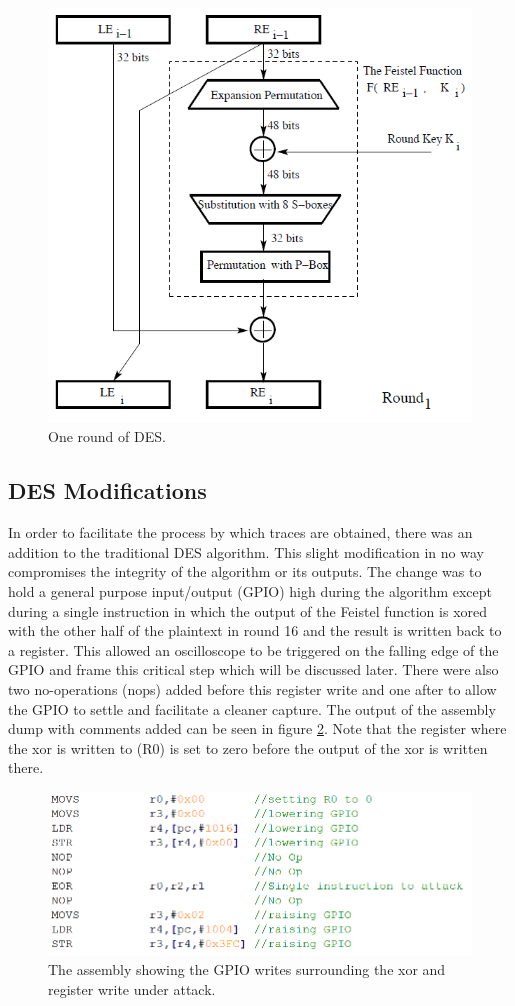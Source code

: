 	\begin{figure}[h]
	\centering
	\includegraphics[width=0.7\linewidth]{./round}
	\caption{One round of DES.}
	\label{fig:round}
	\end{figure}




\subsection{DES Modifications}
	In order to facilitate the process by which traces are obtained, there was an addition to the traditional DES algorithm.  This slight modification in no way compromises the integrity of the algorithm or its outputs.  The change was to hold a general purpose input/output (GPIO) high during the algorithm except during a single instruction in which the output of the Feistel function is xored with the other half of the plaintext in round 16 and the result is written back to a register.  This allowed an oscilloscope to be triggered on the falling edge of the GPIO and frame this critical step which will be discussed later.  There were also two no-operations (nops) added before this register write and one after to allow the GPIO to settle and facilitate a cleaner capture.  The output of the assembly dump with comments added can be seen in figure \ref{fig:asm_snippet}.  Note that the register where the xor is written to (R0) is set to zero before the output of the xor is written there.
	
	\begin{figure}[h]
	\centering
	\includegraphics[width=0.7\linewidth]{./asm_snippet}
	\caption{The assembly showing the GPIO writes surrounding the xor and register write under attack.}
	\label{fig:asm_snippet}
	\end{figure}

